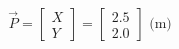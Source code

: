 \documentclass[preview]{standalone}
\begin{document}
\begin{align*}
\vec{P} = \begin{bmatrix} X \\ Y \end{bmatrix} = \begin{bmatrix} 2.5 \\ 2.0 \end{bmatrix} \text{ (m)}
\end{align*}
\end{document}

